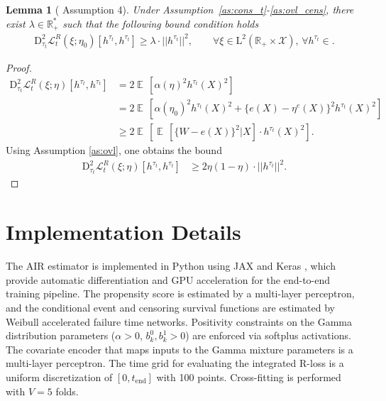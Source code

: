 \documentclass{article}
\newtheorem{lemma}[theorem]{Lemma}
\DeclareMathOperator{\EX}{\mathbb{E}\,}
\newcommand{\tend}{t_{\mathrm{end}}}
\newcommand{\Rp}{\mathbb{R}_+}
\newcommand{\Rpstar}{\mathbb{R}_+^\ast}
\newcommand{\bD}{\mathrm{D}}
\begin{document}
\begin{lemma}[\citet{foster2023orthogonal} Assumption 4]
Under Assumption~\ref{as:cons_t}-\ref{as:ovl_cens}, there exist $\lambda \in \Rpstar$ such that the following bound condition holds 
\begin{align*}
\bD_{\tau_t}^2 \mathcal{L}^R_t(\xi ;\eta_0)[h^{\tau_t}, h^{\tau_t}] \geq \lambda \cdot ||h^{\tau_t}||^2, 
\qquad \forall \xi \in \mathrm{L}^2(\Rp \times \mathcal{X}),
\, \forall h^{\tau_t} \in .%
\end{align*}
\end{lemma}
\begin{proof}
\begin{align*}
\bD_{\tau_t}^2 \mathcal{L}^R_t(\xi ; \eta)[h^{\tau_t}, h^{\tau_t}] 
&= 2\EX\!\left[\alpha(\eta)^2 h^{\tau_t}(X)^2 \right] \\  
&= 2\EX\!\left[\alpha(\eta_0)^2 h^{\tau_t}(X)^2 + \{e(X) - \eta^e(X)\}^2 h^{\tau_t}(X)^2 \right] \\  
&\geq 2 \EX\!\left[ \EX[ \{ W - e(X) \}^2 | X] \cdot h^{\tau_t}(X)^2 \right].
\end{align*}
Using Assumption \ref{as:ovl}, one obtains the bound
\begin{align*}
\bD_{\tau_t}^2 \mathcal{L}^R_t(\xi; \eta)[h^{\tau_t},h^{\tau_t}] 
&\geq 2 \eta(1-\eta) \cdot || h^{\tau_t}||^2.
\end{align*}
\end{proof}

\section{Implementation Details}\label{appendix:implementation}

The AIR estimator is implemented in Python using JAX \citep{jax2018github} and Keras \citep{chollet2025deep}, which provide automatic differentiation and GPU acceleration for the end-to-end training pipeline. The propensity score is estimated by a multi-layer perceptron, and the conditional event and censoring survival functions are estimated by Weibull accelerated failure time networks. Positivity constraints on the Gamma distribution parameters ($\alpha > 0$, $b_k^0, b_k^1 > 0$) are enforced via softplus activations. The covariate encoder that maps inputs to the Gamma mixture parameters is a multi-layer perceptron. The time grid for evaluating the integrated R-loss is a uniform discretization of $[0, \tend]$ with 100 points. Cross-fitting is performed with $V = 5$ folds.
\end{document}
